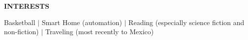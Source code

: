 \begin{center}
\textbf{INTERESTS}
\end{center}

\vspace{\sectionTitleSpacing}

\begin{center}
Basketball $|$ Smart Home (automation) $|$ Reading (especially science fiction and non-fiction) $|$ Traveling (most recently to Mexico)
\end{center} 